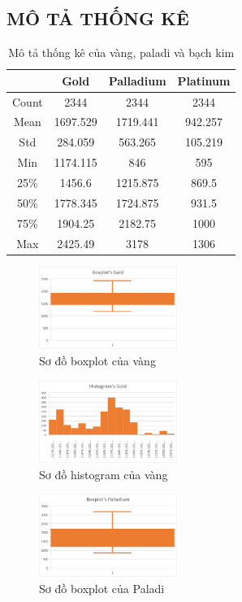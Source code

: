\subsection{MÔ TẢ THỐNG KÊ}
\begin{table}[htbp]
  \centering
\begin{tabular}{|c|c|c|c|}
    \hline
     \  & Gold & Palladium & Platinum \\ \hline
     Count & 2344 & 2344 & 2344\\ \hline
     Mean & 1697.529 & 1719.441 & 942.257\\ \hline
     Std & 284.059 & 563.265 & 105.219\\ \hline
     Min & 1174.115 & 846 & 595\\ \hline
     25\% & 1456.6 & 1215.875 & 869.5\\ \hline
     50\% & 1778.345 & 1724.875 & 931.5\\ \hline
     75\% & 1904.25 & 2182.75 & 1000\\ \hline
     Max & 2425.49 & 3178 & 1306\\ \hline
\end{tabular}
\caption{Mô tả thống kê của vàng, paladi và bạch kim}
\end{table}

\begin{figure}[htbp]
\centerline{\includegraphics[width=0.4\textwidth]{img/Picture2.png}}
\caption{Sơ đồ boxplot của vàng}
\label{fig}
\end{figure}

\begin{figure}[htbp]
\centerline{\includegraphics[width=0.4\textwidth]{img/Picture5.png}}
\caption{Sơ đồ histogram của vàng}
\label{fig}
\end{figure}

\begin{figure}[htbp]
\centerline{\includegraphics[width=0.4\textwidth]{img/Picture3.png}}
\caption{Sơ đồ boxplot của Paladi}
\label{fig}
\end{figure}

